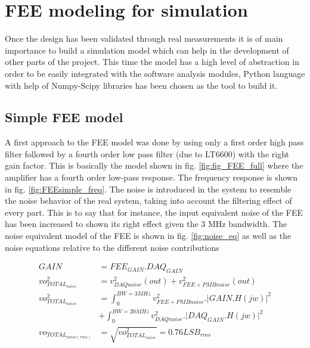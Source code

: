 \documentclass[a4paper,11pt]{report}
\begin{document}
\section{FEE modeling for simulation}
Once the design has been validated through real measurements it is of main importance to build a simulation model which can help in the development of other parts of the project. This time the model has a high level of abstraction in order to be easily integrated with the software analysis modules, Python language with help of Numpy-Scipy libraries has been chosen as the tool to build it.
\subsection{Simple FEE model}
A first approach to the FEE model was done by using only a first order high pass filter followed by a fourth order low pass filter (due to LT6600) with the right gain factor. This is basically the model shown in fig. \ref{fig:fig_FEE_full} where the amplifier has a fourth order low-pass response. The frequency response is shown in fig. \ref{fig:FEEsimple_freq}. The noise is introduced in the system to resemble the noise behavior of the real system, taking into account the filtering effect of every part. This is to say that for instance, the input equivalent noise of the FEE has been increased to shown its right effect given the 3 MHz bandwidth. The noise equivalent model of the FEE is shown in fig. \ref{fig:noise_eq} as well as the noise equations relative to the different noise contributions



\begin{align}  
  GAIN &= FEE_{GAIN}.DAQ_{GAIN} \\ 
  vo_{TOTAL_{noise}}^{2} &= v_{DAQnoise}^{2}(out) + v_{FEE+PMBnoise}^{2}(out) \\
  vo_{TOTAL_{noise}}^{2} &= \int_{0}^{BW=3MHz}{v_{FEE+PMBnoise}^{2}.{\lvert}GAIN.H(jw){\rvert}^2}  \\
  & + \int_{0}^{BW=20MHz}{v_{DAQnoise}^{2}.{\lvert}DAQ_{GAIN}.H(jw){\rvert}^2}\\
  vo_{TOTAL_{noise(rms)}} &= \sqrt{vo_{TOTAL_{noise}}^{2}} = 0.76LSB_{rms}  
\end{align}
\end{document}
